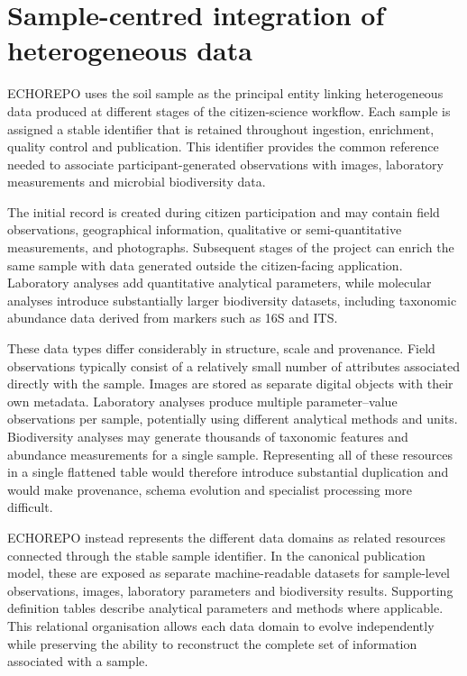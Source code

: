 \section{Sample-centred integration of heterogeneous data}

ECHOREPO uses the soil sample as the principal entity linking heterogeneous data produced at different stages of the citizen-science workflow. Each sample is assigned a stable identifier that is retained throughout ingestion, enrichment, quality control and publication. This identifier provides the common reference needed to associate participant-generated observations with images, laboratory measurements and microbial biodiversity data.

The initial record is created during citizen participation and may contain field observations, geographical information, qualitative or semi-quantitative measurements, and photographs. Subsequent stages of the project can enrich the same sample with data generated outside the citizen-facing application. Laboratory analyses add quantitative analytical parameters, while molecular analyses introduce substantially larger biodiversity datasets, including taxonomic abundance data derived from markers such as 16S and ITS.

These data types differ considerably in structure, scale and provenance. Field observations typically consist of a relatively small number of attributes associated directly with the sample. Images are stored as separate digital objects with their own metadata. Laboratory analyses produce multiple parameter--value observations per sample, potentially using different analytical methods and units. Biodiversity analyses may generate thousands of taxonomic features and abundance measurements for a single sample. Representing all of these resources in a single flattened table would therefore introduce substantial duplication and would make provenance, schema evolution and specialist processing more difficult.

ECHOREPO instead represents the different data domains as related resources connected through the stable sample identifier. In the canonical publication model, these are exposed as separate machine-readable datasets for sample-level observations, images, laboratory parameters and biodiversity results. Supporting definition tables describe analytical parameters and methods where applicable. This relational organisation allows each data domain to evolve independently while preserving the ability to reconstruct the complete set of information associated with a sample.

